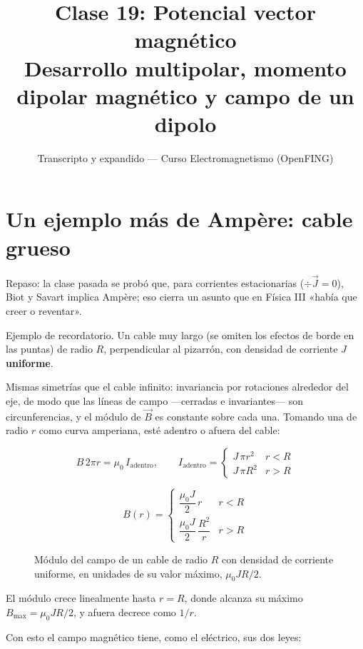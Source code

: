 \documentclass[12pt,a4paper]{article}
\title{\textbf{Clase 19: Potencial vector magnético} \\[0.3em]
        \large{Desarrollo multipolar, momento dipolar magnético y campo de un dipolo}}
\author{Transcripto y expandido --- Curso Electromagnetismo (OpenFING)}
\date{}
\begin{document}
\maketitle
\thispagestyle{empty}
\newpage

\tableofcontents
\newpage

\section{Un ejemplo más de Ampère: cable grueso}

Repaso: la clase pasada se probó que, para corrientes estacionarias
($\div \vec J = 0$), Biot y Savart implica Ampère; eso cierra un asunto
que en Física III «había que creer o reventar».

Ejemplo de recordatorio. Un cable muy largo (se omiten los efectos de borde en
las puntas) de radio $R$, perpendicular al pizarrón, con densidad de corriente
$J$ \textbf{uniforme}.

Mismas simetrías que el cable infinito: invariancia por rotaciones alrededor
del eje, de modo que las líneas de campo ---cerradas e invariantes--- son
circunferencias, y el módulo de $\vec B$ es constante sobre cada una. Tomando
una de radio $r$ como curva amperiana, esté adentro o afuera del cable:

\[
B\,2\pi r = \mu_0\,I_{\text{adentro}},
\qquad
I_{\text{adentro}} =
\begin{cases}
J\,\pi r^2 & r<R\\[2pt]
J\,\pi R^2 & r>R
\end{cases}
\]

\begin{keybox}
\[
\boxed{\ B(r) =
\begin{cases}
\dfrac{\mu_0 J}{2}\,r & r<R\\[8pt]
\dfrac{\mu_0 J}{2}\,\dfrac{R^2}{r} & r>R
\end{cases}\ }
\]
\end{keybox}

\begin{figure}[H]
  \centering
  
  \caption{Módulo del campo de un cable de radio $R$ con densidad de corriente uniforme, en unidades de su valor máximo, $\mu_0 J R/2$.}
\end{figure}

El módulo crece linealmente hasta $r=R$, donde alcanza su máximo
$B_{\max} = \mu_0 J R/2$, y afuera decrece como $1/r$.

Con esto el campo magnético tiene, como el eléctrico, sus dos leyes:
\end{document}

